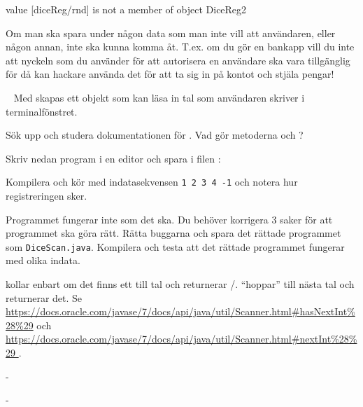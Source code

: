 {\SubtaskSolved  \begin{REPL}
value [diceReg/rnd] is not a member of object DiceReg2
\end{REPL}

\SubtaskSolved  Om man ska spara under någon data som man inte vill att användaren, eller någon annan, inte ska kunna komma åt.
T.ex. om du gör en bankapp vill du inte att nyckeln som du använder för att autorisera en användare ska vara tillgänglig för då kan hackare använda det för att ta sig in på kontot och stjäla pengar!



\QUESTEND









\QUESTBEGIN

\Task  \what~  Med  skapas ett objekt som kan läsa in tal som användaren skriver i terminalfönstret.

\Subtask Sök upp och studera dokumentationen för . Vad gör metoderna  och ?

\Subtask Skriv nedan program i en editor och spara i filen :


\Subtask Kompilera och kör med indatasekvensen \texttt{1 2 3 4 -1} och notera hur registreringen sker.

\Subtask Programmet fungerar inte som det ska. Du behöver korrigera 3 saker för att programmet ska göra rätt. Rätta buggarna och spara det rättade programmet som \texttt{DiceScan.java}. Kompilera och testa att det rättade programmet fungerar med olika indata.


\SOLUTION


\TaskSolved \what


\SubtaskSolved  {} kollar enbart om det finns ett till tal och returnerar /.  “hoppar” till nästa tal och returnerar det.
Se \url{https://docs.oracle.com/javase/7/docs/api/java/util/Scanner.html#hasNextInt%28%29} och \url{https://docs.oracle.com/javase/7/docs/api/java/util/Scanner.html#nextInt%28%29 }.

\SubtaskSolved  -

\SubtaskSolved  -

}
